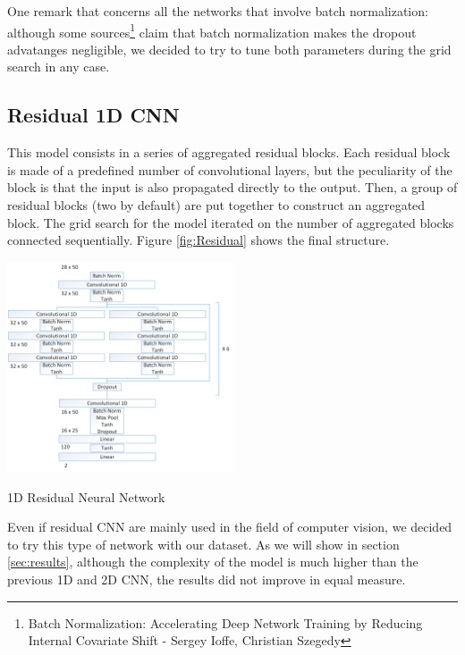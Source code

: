 \documentclass[10pt,conference,compsocconf]{IEEEtran}
\begin{document}
One remark that concerns all the networks that involve batch normalization: although some sources\footnote{Batch Normalization: Accelerating Deep Network Training by Reducing Internal Covariate Shift - Sergey Ioffe, Christian Szegedy} claim that batch normalization makes the dropout advatanges negligible, we decided to try to tune both parameters during the grid search in any case.


\subsection{Residual 1D CNN}
This model consists in a series of aggregated residual blocks. Each residual block is made of a predefined number of convolutional layers, but the peculiarity of the block is that the input is also propagated directly to the output. Then, a group of residual blocks (two by default) are put together to construct an aggregated block. The grid search for the model iterated on the number of aggregated blocks connected sequentially. Figure \ref{fig:Residual} shows the final structure.


\begin{center}
	\captionsetup{type=figure}
	\includegraphics[width=0.5\textwidth]{img/Residual1D.png}
	\caption {1D Residual Neural Network}
	\label{fig:Residual}
\end{center}

Even if residual CNN are mainly used in the field of computer vision, we decided to try this type of network with our dataset. As we will show in section \ref{sec:results}, although the complexity of the model is much higher than the previous 1D and 2D CNN, the results did not improve in equal measure.
\end{document}
